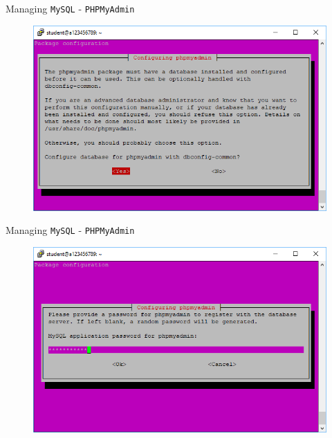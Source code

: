 \documentclass[xcolor=table]{beamer}
\begin{document}
\begin{frame}{Managing \texttt{MySQL} - \texttt{PHPMyAdmin}}
  \begin{figure}
    \begin{center}
      \includegraphics[width=1\linewidth]{MySQLInstall2.png}
    \end{center}
  \end{figure}
\end{frame}

\begin{frame}{Managing \texttt{MySQL} - \texttt{PHPMyAdmin}}
  \begin{figure}
    \begin{center}
      \includegraphics[width=1\linewidth]{MySQLInstall3.png}
    \end{center}
  \end{figure}
\end{frame}
\end{document}
